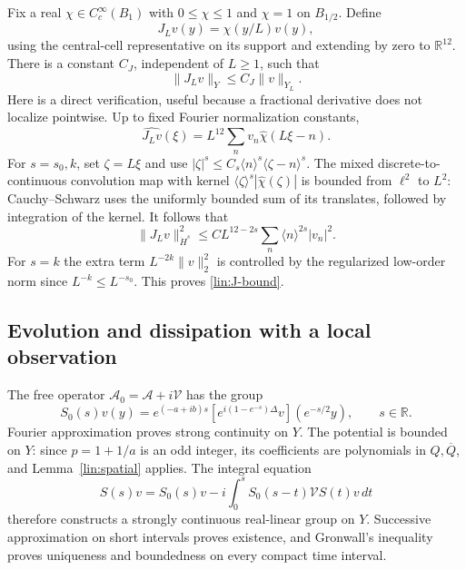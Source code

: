 Fix a real $\chi\in C_c^\infty(B_1)$ with $0\le\chi\le1$ and
$\chi=1$ on $B_{1/2}$.  Define
\begin{equation}\label{lin:localization}
 J_Lv(y)=\chi(y/L)v(y),
\end{equation}
using the central-cell representative on its support and extending by
zero to $\mathbb R^{12}$.  There is a constant $C_J$, independent of
$L\ge1$, such that
\begin{equation}\label{lin:J-bound}
 \|J_Lv\|_Y\le C_J\|v\|_{Y_L}.
\end{equation}
Here is a direct verification, useful because a fractional derivative
does not localize pointwise.  Up to fixed Fourier normalization constants,
\[
 \widehat{J_Lv}(\xi)=L^{12}\sum_nv_n\widehat\chi(L\xi-n).
\]
For $s=s_0,k$, set $\zeta=L\xi$ and use
$|\zeta|^s\le C_s\langle n\rangle^s\langle\zeta-n\rangle^s$.
The mixed discrete-to-continuous convolution map with kernel
$\langle\zeta\rangle^s|\widehat\chi(\zeta)|$ is bounded from
$\ell^2$ to $L^2$: Cauchy--Schwarz uses the uniformly bounded sum of
its translates, followed by integration of the kernel.  It follows that
\[
 \|J_Lv\|_{\dot H^s}^2
 \le C L^{12-2s}\sum_n\langle n\rangle^{2s}|v_n|^2.
\]
For $s=k$ the extra term $L^{-2k}\|v\|_2^2$ is controlled by the
regularized low-order norm since $L^{-k}\le L^{-s_0}$.  This proves
\eqref{lin:J-bound}.

\subsection{Evolution and dissipation with a local observation}

The free operator $\mathcal A_0=\mathcal A+i\mathcal V$ has the group
\begin{equation}\label{lin:free-flow}
 S_0(s)v(y)=e^{(-a+ib)s}
 \left[e^{i(1-e^{-s})\Delta}v\right](e^{-s/2}y),\qquad s\in\mathbb R.
\end{equation}
Fourier approximation proves strong continuity on $Y$.  The potential
is bounded on $Y$: since $p=1+1/a$ is an odd integer, its coefficients
are polynomials in $Q,\overline Q$, and Lemma~\ref{lin:spatial} applies.
The integral equation
\begin{equation}\label{lin:mild}
 S(s)v=S_0(s)v-i\int_0^s S_0(s-t)\mathcal V S(t)v\,dt
\end{equation}
therefore constructs a strongly continuous real-linear group on $Y$.
Successive approximation on short intervals proves existence, and
Gronwall's inequality proves uniqueness and boundedness on every compact
time interval.

